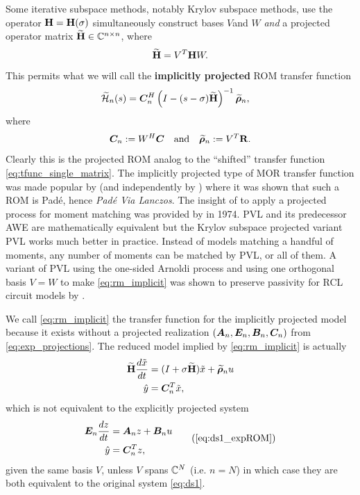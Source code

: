\bigskip
Some iterative subspace methods, notably Krylov subspace methods,  use the operator $\textbf{\textup{H}}=\textbf{\textup{H}}(\sigma)$ simultaneously construct  bases $V $and $W$ \emph{and} a projected operator matrix $\widetilde{\textbf{\textup{H}}}\in \mathbb{C}^{n \times n}$, where
\[
\widetilde{\textbf{\textup{H}}} = V^T \textbf{\textup{H}} W.
\]
This permits what we will call the \textbf{implicitly projected} ROM transfer function 
 \begin{align}
      \widetilde{\mathcal{H}}_n(s) &=  \bm{C}_n^H \left(I-(s-\sigma )\widetilde{\textbf{\textup{H}}}\right)^{-1}\widetilde{\boldsymbol{\rho}}_n,
      \label{eq:rm_implicit}
      \end{align}
      where
      \[
        \bm{C}_n := W^H \bm{C} \quad\textrm{and}\quad \widetilde{\boldsymbol{\rho}}_n := V^T \textbf{\textup{R}}.
      \]
Clearly this is the projected ROM analog to the ``shifted'' transfer function \eqref{eq:tfunc_single_matrix}.
The implicitly projected type of MOR transfer function was made popular by \cite{PVL} (and independently by \cite{gallivan1994asymptotic}) where it was shown that such a ROM is Pad\'e, hence \emph{Pad\'e Via Lanczos}.   The insight of \cite{PVL,gallivan1994asymptotic} to apply a projected process for moment matching was provided by \cite{gragg1974matrix} in 1974.  PVL and its predecessor AWE are mathematically equivalent but the Krylov subspace projected variant PVL works much better in practice.  Instead of models matching a handful of moments, any number of moments can be matched by PVL, or all of them.  A variant of PVL using the one-sided Arnoldi process and using one orthogonal basis $V=W$ to make \eqref{eq:rm_implicit} was shown to preserve passivity for RCL circuit models by \cite{arnoldiMOR}.  
  
We call \eqref{eq:rm_implicit} the transfer function for the implicitly projected model because it exists without a projected realization $(\bm{A}_n,\bm{E}_n,\bm{B}_n,\bm{C}_n)$ from \eqref{eq:exp_projections}.   The reduced model implied by \eqref{eq:rm_implicit} is actually
  \begin{equation}
         \begin{aligned}
                \widetilde{\textbf{\textup{H}}} \frac{d\tilde{x}}{dt} &=  (I+\sigma \widetilde{\textbf{\textup{H}}})\tilde{x} + \widetilde{\boldsymbol{\rho}}_n u\\
                \hat{y} &= \bm{C}_n^T \tilde{x},
        \end{aligned}
        \label{eq:implied_ds1}
        \end{equation}
which is not equivalent to the explicitly projected system 
 \begin{equation}
         \begin{aligned}
                \E_n \frac{dz}{dt} &= \A_nz + \BB_n u\\
                \hat{y} &= \CC_n^T z,
        \end{aligned}
        \tag{\ref{eq:ds1_expROM}}
        \end{equation}
 given the same basis $V$, unless $V$ spans $\mathbb{C}^N$ (i.e. $n=N$) in which case they are both equivalent to the original system \eqref{eq:ds1}.   

